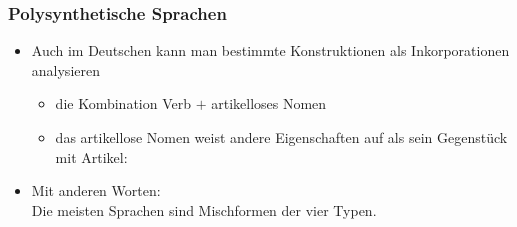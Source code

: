 \begin{frame}
\frametitle{Polysynthetische Sprachen}

\begin{itemize}
	\item Auch im Deutschen kann man bestimmte Konstruktionen als Inkorporationen analysieren
	
	\begin{itemize}
		\item die Kombination Verb $+$ artikelloses Nomen
		\item das artikellose Nomen weist andere Eigenschaften auf als sein Gegenstück mit Artikel:
		
		\z
			 
		\z
			 
		\z
			 
	\end{itemize}
	\item Mit anderen Worten: \\
		Die meisten Sprachen sind Mischformen der vier Typen.
\end{itemize}


\end{frame}


